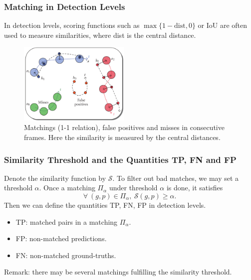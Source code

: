 \documentclass[slidetop, mathserif]{beamer}
\begin{document}
\begin{frame}
	\frametitle{Matching in Detection Levels}
			
	In detection levels, scoring functions such as $\max\{1-\text{dist}, 0\}$ or IoU
	are often used to measure similarities, where dist is the central distance.
			
	\vspace{-10pt}
	\begin{figure}
		\includegraphics[width=150pt]{pics/fig2.png}
		\caption{Matchings (1-1 relation), false positives and misses in consecutive frames.
		Here the similarity is measured by the central distances.}
	\end{figure}
			
\end{frame}

\begin{frame}
	\frametitle{Similarity Threshold and the Quantities TP, FN and FP}
		
	Denote the similarity function by $\mathcal S$.
	To filter out bad matches, we may set a threshold $\alpha$.
	Once a matching $\Pi_\alpha$ under threshold $\alpha$ is done, it satisfies
	\[
		\forall\ (g,p)\in\Pi_\alpha, ~ \mathcal S(g,p) \geq \alpha.
	\]
	Then we can define the quantities TP, FN, FP in detection levels.
	\begin{itemize}
		\item TP: matched pairs in a matching $\Pi_\alpha$.
		\item FP: non-matched predictions.
		\item FN: non-matched ground-truths.
	\end{itemize}
	Remark: there may be several matchings fulfilling the similarity threshold.
\end{frame}
\end{document}
